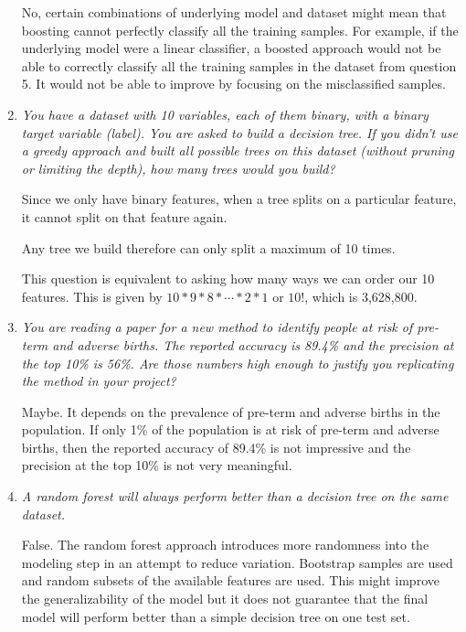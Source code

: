\documentclass[11pt]{article}
\begin{document}
\begin{enumerate}
        No, certain combinations of underlying model and dataset might mean
        that boosting cannot perfectly classify all the training samples. For
        example, if the underlying model were a linear classifier, a boosted
        approach would not be able to correctly classify all the training
        samples in the dataset from question 5. It would not be able to
        improve by focusing on the misclassified samples.

    \item \textit{You have a dataset with 10 variables, each of them binary,
        with a binary target variable (label). You are asked to build a
        decision tree. If you didn't use a greedy approach and built all
        possible trees on this dataset (without pruning or limiting the
        depth), how many trees would you build?}

        Since we only have binary features, when a tree splits on a particular
        feature, it cannot split on that feature again.

        Any tree we build therefore can only split a maximum of 10 times.

        This question is equivalent to asking how many ways we can order our 10
        features. This is given by $10 * 9 * 8 * \cdots * 2 * 1$ or $10!$,
        which is 3,628,800.

    \item \textit{You are reading a paper for a new method to identify people
        at risk of pre-term and adverse births. The reported accuracy is 89.4\%
        and the precision at the top 10\% is 56\%. Are those numbers high
        enough to justify you replicating the method in your project?}

        Maybe. It depends on the prevalence of pre-term and adverse births in
        the population. If only 1\% of the population is at risk of pre-term
        and adverse births, then the reported accuracy of 89.4\% is not
        impressive and the precision at the top 10\% is not very meaningful.

    \item \textit{A random forest will always perform better than a decision
        tree on the same dataset.}

        False. The random forest approach introduces more randomness into the
        modeling step in an attempt to reduce variation. Bootstrap samples are
        used and random subsets of the available features are used. This might
        improve the generalizability of the model but it does not guarantee
        that the final model will perform better than a simple decision tree on
        one test set.


\end{enumerate}
\end{document}
